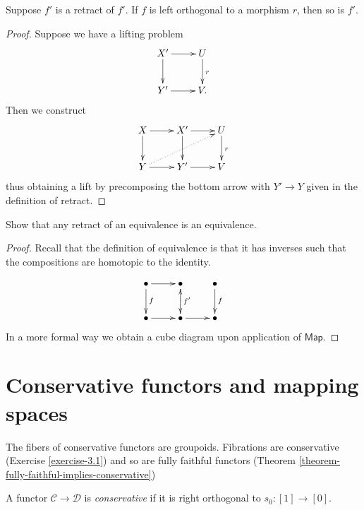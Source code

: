 \begin{lemma}
\label{lemma-retract-orthogonality}
Suppose $f'$ is a retract of $f'$.
If $f$ is left orthogonal to a morphism
$r$, then so is $f'$.
\end{lemma}

\begin{proof}
Suppose we have a lifting problem
$$
\xymatrix{
X'\ar[r]\ar[d]&U\ar[d]^r\\
Y'\ar[r]&V.
}
$$
Then we construct
$$
\xymatrix{
X\ar[r]\ar[d]&X'\ar[r]\ar[d]&U\ar[d]^{r}\\
Y\ar[r]\ar@{.>}[urr]&Y'\ar[r]&V
}
$$
thus obtaining a lift by precomposing the 
bottom arrow with $Y' \to Y$
given in the definition of retract.
\end{proof}

\begin{exercise}
\label{exercise-retract-of-equivalence-is-equivalence}
Show that any retract of an equivalence is an equivalence.
\end{exercise}

\begin{proof}
Recall that the definition of
equivalence is that it has inverses such
that the compositions are homotopic to the identity.

$$
\xymatrix{
\bullet\ar[r]\ar[d]^f&\bullet\ar[d]^{f'}&\bullet\ar[d]^{f}\\
\bullet\ar[r]&\bullet\ar@{.>}[u]\ar[r]&\bullet
}
$$
In a more formal way we obtain a cube diagram
upon application of $\mathsf{Map}$.
\end{proof}


\section{Conservative functors and mapping spaces}
\label{section-conservative-functors-and-mapping-spaces}

\noindent
The fibers of conservative functors are groupoids.
Fibrations are conservative (Exercise \ref{exercise-3.1})
and so are fully faithful functors (Theorem
\ref{theorem-fully-faithful-implies-conservative})

\begin{definition}
\label{definition-conservative-functor}
A functor $\mathcal{C} \to \mathcal{D}$ is {\it conservative} 
if it is right orthogonal to $s_0:[1]\to [0]$.
\end{definition}


